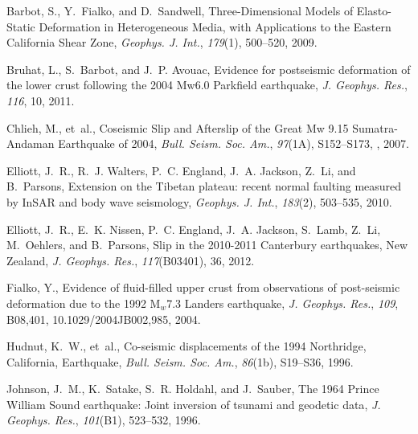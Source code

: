 \documentclass[10pt]{article}
\begin{document}
\begin{thebibliography}{30}
Barbot, S., Y.~Fialko, and D.~Sandwell, {Three-Dimensional Models of
  Elasto-Static Deformation in Heterogeneous Media, with Applications to the
  Eastern California Shear Zone}, \textit{Geophys. J. Int.}, \textit{179}(1),
  500--520, 2009{}.

Bruhat, L., S.~Barbot, and J.~P. Avouac, {Evidence for postseismic deformation
  of the lower crust following the 2004 Mw6.0 Parkfield earthquake}, \textit{J.
  Geophys. Res.}, \textit{116}, 10, 2011.

Chlieh, M., et~al., {Coseismic Slip and Afterslip of the Great Mw 9.15
  Sumatra-Andaman Earthquake of 2004}, \textit{Bull. Seism. Soc. Am.},
  \textit{97}(1A), S152--S173, , 2007.

Elliott, J.~R., R.~J. Walters, P.~C. England, J.~A. Jackson, Z.~Li, and
  B.~Parsons, {Extension on the Tibetan plateau: recent normal faulting
  measured by InSAR and body wave seismology}, \textit{Geophys. J. Int.},
  \textit{183}(2), 503--535, 2010.

Elliott, J.~R., E.~K. Nissen, P.~C. England, J.~A. Jackson, S.~Lamb, Z.~Li,
  M.~Oehlers, and B.~Parsons, {Slip in the 2010-2011 Canterbury earthquakes,
  New Zealand}, \textit{J. Geophys. Res.}, \textit{117}(B03401), 36, 2012.

Fialko, Y., {Evidence of fluid-filled upper crust from observations of
  post-seismic deformation due to the 1992 M$_w$7.3 Landers earthquake},
  \textit{J. Geophys. Res.}, \textit{109}, B08,401, 10.1029/2004JB002,985,
  2004.

Hudnut, K.~W., et~al., {Co-seismic displacements of the 1994 Northridge,
  California, Earthquake}, \textit{Bull. Seism. Soc. Am.}, \textit{86}(1b),
  S19--S36, 1996.

Johnson, J.~M., K.~Satake, S.~R. Holdahl, and J.~Sauber, {The 1964 Prince
  William Sound earthquake: Joint inversion of tsunami and geodetic data},
  \textit{J. Geophys. Res.}, \textit{101}(B1), 523--532, 1996.


\end{thebibliography}
\end{document}

